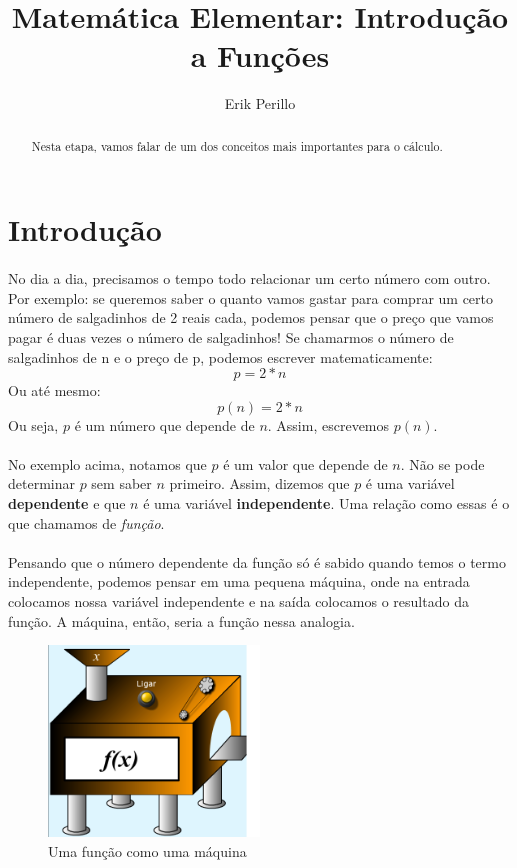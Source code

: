 \documentclass[11pt]{article}
\begin{document}
\title{Matemática Elementar: Introdução a Funções}
\author{Erik Perillo}
\date{}
\maketitle
\begin{abstract}
Nesta etapa, vamos falar de um dos conceitos mais importantes para o cálculo.
\end{abstract}

\newpage

\tableofcontents

\newpage

\section{Introdução}
\paragraph{}
No dia a dia, precisamos o tempo todo relacionar um certo número com outro.
Por exemplo: se queremos saber o quanto vamos gastar para comprar um certo
número de salgadinhos de 2 reais cada, podemos pensar que o preço que vamos 
pagar é duas vezes o número de salgadinhos! Se chamarmos o número de 
salgadinhos de n e o preço de p, podemos escrever matematicamente:
$$p = 2*n$$
Ou até mesmo:
$$p(n) = 2*n$$
Ou seja, $p$ é um número que depende de $n$. Assim, escrevemos $p(n)$.
\paragraph{} 
No exemplo acima, notamos que $p$ é um valor que depende de $n$. Não se pode
determinar $p$ sem saber $n$ primeiro. Assim, dizemos que $p$ é uma variável
\textbf{dependente} e que $n$ é uma variável \textbf{independente}. Uma 
relação como essas é o que chamamos de \emph{função}.
\paragraph{}
Pensando que o número dependente da função só é sabido quando temos o termo
independente, podemos pensar em uma pequena máquina, onde na entrada colocamos 
nossa variável independente e na saída colocamos o resultado da função. A
máquina, então, seria a função nessa analogia.

\begin{figure}[H]
  		\centering
    	\includegraphics[width=0.5\textwidth]{imgs/funcao.png}
		\caption[9pt]{Uma função como uma máquina}
\end{figure}
\end{document}
